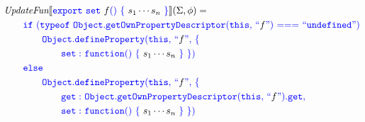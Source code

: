 \documentclass[a4paper]{article}
\newcommand{\code}[1]{\textcolor{blue}{\tt #1}}
\newcommand{\UpdateFun}{\emph{UpdateFun}}
\begin{document}
\begin{equation*}
\begin{split}
&\UpdateFun \llbracket \code{export}\ \code{set}\ f\code{()}\ \code{\{}\ s_1 \cdots s_n\ \code{\}} \rrbracket (\Sigma, \phi) = \\
&\qquad \code{if}\ \code{(typeof}\ \code{Object.getOwnPropertyDescriptor(this,}\ \code{``}f\code{")}\ \code{===}\ \code{``undefined")} \\
&\qquad\qquad \code{Object.defineProperty(this,}\ \code{``}f\code{",}\ \code{\{} \\
&\qquad\qquad\qquad \code{set:}\ \code{function()}\ \code{\{}\ s_1 \cdots s_n\ \code{\}\ \})} \\
&\qquad \code{else} \\
&\qquad\qquad \code{Object.defineProperty(this,}\ \code{``}f\code{",}\ \code{\{} \\
&\qquad\qquad\qquad \code{get:}\ \code{Object.getOwnPropertyDescriptor(this,}\ \code{``}f\code{").get,} \\
&\qquad\qquad\qquad \code{set:}\ \code{function()}\ \code{\{}\ s_1 \cdots s_n\ \code{\}\ \})}
\end{split}
\end{equation*}
\end{document}

